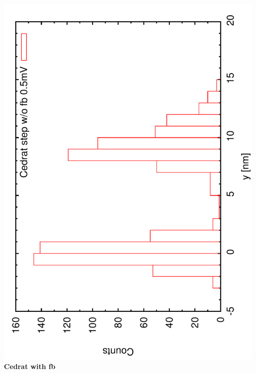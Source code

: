 \documentclass[a4paper,11pt]{book}
\begin{document}
\includegraphics[angle=-90,scale=0.15]{imagestep31a.pdf}\\
\textbf{Cedrat with fb}\\
\end{document}
